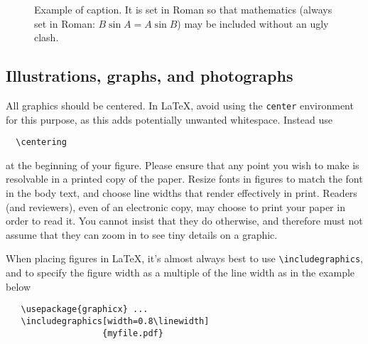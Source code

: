 \documentclass[10pt,twocolumn,letterpaper]{article}
\begin{document}
\begin{figure}[t]
  \centering
  \fbox{\rule{0pt}{2in} \rule{0.9\linewidth}{0pt}}

   \caption{Example of caption.
   It is set in Roman so that mathematics (always set in Roman: $B \sin A = A \sin B$) may be included without an ugly clash.}
   \label{fig:onecol}
\end{figure}


\subsection{Illustrations, graphs, and photographs}

All graphics should be centered.
In \LaTeX, avoid using the \texttt{center} environment for this purpose, as this adds potentially unwanted whitespace.
Instead use
{\small\begin{verbatim}
  \centering
\end{verbatim}}
at the beginning of your figure.
Please ensure that any point you wish to make is resolvable in a printed copy of the paper.
Resize fonts in figures to match the font in the body text, and choose line widths that render effectively in print.
Readers (and reviewers), even of an electronic copy, may choose to print your paper in order to read it.
You cannot insist that they do otherwise, and therefore must not assume that they can zoom in to see tiny details on a graphic.

When placing figures in \LaTeX, it's almost always best to use \verb+\includegraphics+, and to specify the figure width as a multiple of the line width as in the example below
{\small\begin{verbatim}
   \usepackage{graphicx} ...
   \includegraphics[width=0.8\linewidth]
                   {myfile.pdf}
\end{verbatim}
}




{\small


}
\end{document}
